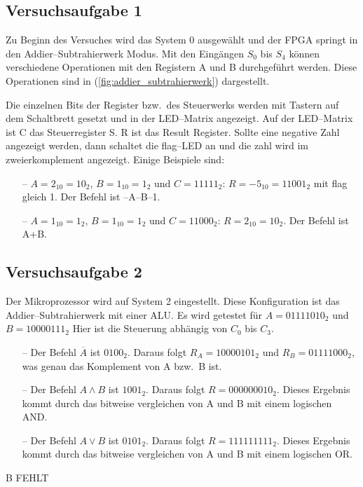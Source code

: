 \documentclass[10pt]{article}
\begin{document}
\begin{multicols}{2}
	\subsection{Versuchsaufgabe 1}
	Zu Beginn des Versuches wird das System 0 ausgewählt und der FPGA springt in den Addier--Subtrahierwerk Modus.
	Mit den Eingängen $S_0$ bis $S_4$ können verschiedene Operationen mit den Registern A und B durchgeführt werden.
	Diese Operationen sind in (\ref{fig:addier_subtrahierwerk}) dargestellt.
	\par Die einzelnen Bits der Register bzw.\ des Steuerwerks werden mit Tastern auf dem Schaltbrett gesetzt und in der LED--Matrix angezeigt.
	Auf der LED--Matrix ist C das Steuerregister S.
	R ist das Result Register.
	Sollte eine negative Zahl angezeigt werden, dann schaltet die flag--LED an und die zahl wird im zweierkomplement angezeigt.
	Einige Beispiele sind:
	\begin{enumerate}
		\item[--] $A=2_{10}=10_{2}$, $B=1_{10}=1_2$ und $C=11111_{2}$: $R=-5_{10}=11001_2$ mit flag gleich 1.
		      Der Befehl ist --A--B--1.
		\item[--] $A=1_{10}=1_2$, $B=1_{10}=1_2$ und $C=11000_2$: $R=2_{10}=10_2$.
		      Der Befehl ist A+B.
	\end{enumerate}

	\subsection{Versuchsaufgabe 2}
	Der Mikroprozessor wird auf System 2 eingestellt.
	Diese Konfiguration ist das Addier--Subtrahierwerk mit einer ALU.
	Es wird getestet für $A=01111010_2$ und $B=10000111_2$
	Hier ist die Steuerung abhängig von $C_0$ bis $C_3$.
	\begin{enumerate}
		\item[--] Der Befehl $\overline{A}$ ist $0100_2$.
		      Daraus folgt $R_A=10000101_2$ und $R_B=01111000_2$, was genau das Komplement von A bzw.\ B ist.
		\item[--] Der Befehl $A\land B$ ist $1001_2$.
		      Daraus folgt $R=000000010_2$.
		      Dieses Ergebnis kommt durch das bitweise vergleichen von A und B mit einem logischen AND.
		\item[--] Der Befehl $A\lor B$ ist $0101_2$.
		      Daraus folgt $R=111111111_2$.
		      Dieses Ergebnis kommt durch das bitweise vergleichen von A und B mit einem logischen OR.
	\end{enumerate}
	B FEHLT


\end{multicols}
\end{document}
